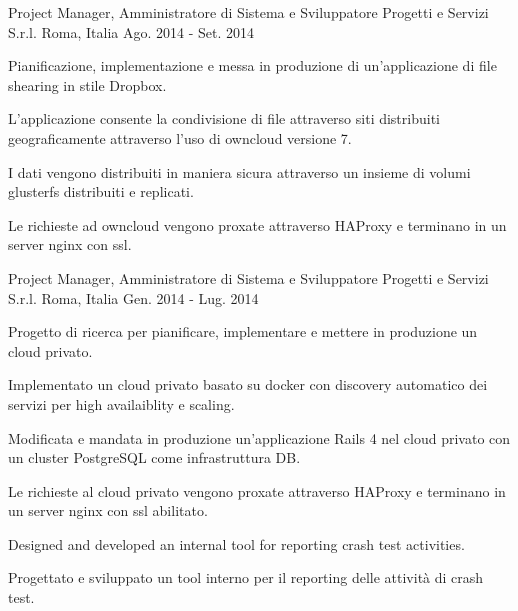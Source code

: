 \begin{cventries}
  \cventry
    {Project Manager, Amministratore di Sistema e Sviluppatore} %
    {Progetti e Servizi S.r.l.} %
    {Roma, Italia} %
    {Ago. 2014 - Set. 2014} %
    {
      \begin{cvitems} %
        \item {Pianificazione, implementazione e messa in produzione di un'applicazione di file shearing in stile Dropbox.}
        \item {L'applicazione consente la condivisione di file attraverso siti distribuiti geograficamente attraverso l'uso di owncloud versione 7.}
        \item {I dati vengono distribuiti in maniera sicura attraverso un insieme di volumi glusterfs distribuiti e replicati.}
        \item {Le richieste ad owncloud vengono proxate attraverso HAProxy e terminano in un server nginx con ssl.}
      \end{cvitems}
    }

  \cventry
    {Project Manager, Amministratore di Sistema e Sviluppatore} %
    {Progetti e Servizi S.r.l.} %
    {Roma, Italia} %
    {Gen. 2014 - Lug. 2014} %
    {
      \begin{cvitems} %
        \item {Progetto di ricerca per pianificare, implementare e mettere in produzione un cloud privato.}
        \item {Implementato un cloud privato basato su docker con discovery automatico dei servizi per high availaiblity e scaling.}
        \item {Modificata e mandata in produzione un'applicazione Rails 4 nel cloud privato con un cluster PostgreSQL come infrastruttura DB.}
        \item {Le richieste al cloud privato vengono proxate attraverso HAProxy e terminano in un server nginx con ssl abilitato.}
        \item {Designed and developed an internal tool for reporting crash test activities.}
        \item {Progettato e sviluppato un tool interno per il reporting delle attività di crash test.}
          \begin{cvsubentries}
          \end{cvsubentries}
      \end{cvitems}
    }


\end{cventries}
